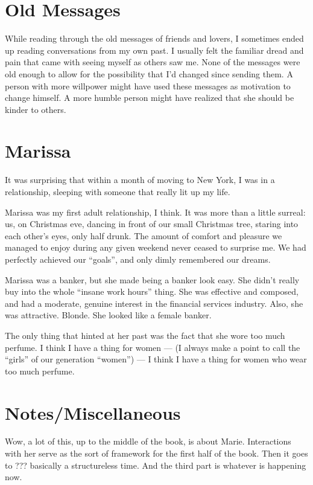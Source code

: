 \documentclass[12pt]{article}
\begin{document}
\section{Old Messages}
While reading through the old messages of friends and lovers, I sometimes ended
up reading conversations from my own past.  I usually felt the familiar dread
and pain that came  with seeing myself as others saw me.  None of the messages
were old enough to allow for the possibility that I'd changed since sending
them.  A person with more willpower might have used these messages as motivation
to change himself.  A more humble person might have realized that she should be
kinder to others.

\section{Marissa}
It was surprising that within a month of moving to New York, I was in a
relationship, sleeping with someone that really lit up my life.

Marissa was my first adult relationship, I think.  It was more than a little
surreal: us, on Christmas eve, dancing in front of our small Christmas tree,
staring into each other's eyes, only half drunk.  The amount of comfort and
pleasure we managed to enjoy during any given weekend never ceased to surprise
me.  We had perfectly achieved our ``goals'', and only dimly remembered our
dreams.

Marissa was a banker, but she made being a banker look easy.  She didn't really
buy into the whole ``insane work hours'' thing.  She was effective and composed,
and had a moderate, genuine interest in the financial services industry.  Also,
she was attractive.  Blonde.  She looked like a female banker. 

The only thing that hinted at her past was the fact that she wore too much
perfume.  I think I have a thing for women --- (I always make a point to call
the ``girls'' of our generation ``women'') --- I think I have a thing for women
who wear too much perfume.


\section{Notes/Miscellaneous}
Wow, a lot of this, up to the middle of the book, is about Marie.  Interactions
with her serve as the sort of framework for the first half of the book.  Then it
goes to ???  basically a structureless time.  And the third part is whatever is
happening now.
\end{document}
